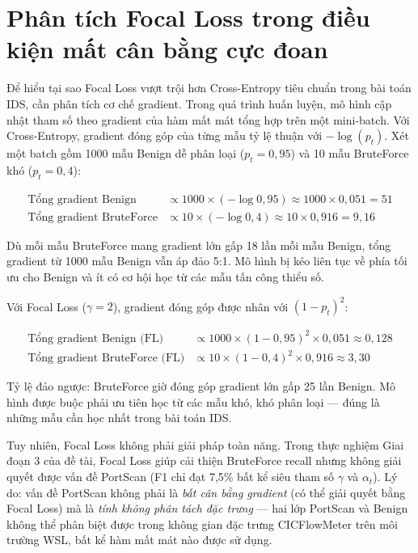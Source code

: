 \documentclass[../DoAn.tex]{subfiles}
\begin{document}
\section{Phân tích Focal Loss trong điều kiện mất cân bằng cực đoan}
\label{sec:pt-focal}

Để hiểu tại sao Focal Loss vượt trội hơn Cross-Entropy tiêu chuẩn trong bài toán IDS, cần phân tích cơ chế gradient. Trong quá trình huấn luyện, mô hình cập nhật tham số theo gradient của hàm mất mát tổng hợp trên một mini-batch. Với Cross-Entropy, gradient đóng góp của từng mẫu tỷ lệ thuận với $-\log(p_t)$. Xét một batch gồm 1000 mẫu Benign dễ phân loại ($p_t = 0{,}95$) và 10 mẫu BruteForce khó ($p_t = 0{,}4$):

\begin{align}
    \text{Tổng gradient Benign} &\propto 1000 \times (-\log 0{,}95) \approx 1000 \times 0{,}051 = 51 \label{eq:grad-benign} \\
    \text{Tổng gradient BruteForce} &\propto 10 \times (-\log 0{,}4) \approx 10 \times 0{,}916 = 9{,}16 \label{eq:grad-bf}
\end{align}

Dù mỗi mẫu BruteForce mang gradient lớn gấp 18 lần mỗi mẫu Benign, tổng gradient từ 1000 mẫu Benign vẫn áp đảo 5:1. Mô hình bị kéo liên tục về phía tối ưu cho Benign và ít có cơ hội học từ các mẫu tấn công thiểu số.

Với Focal Loss ($\gamma = 2$), gradient đóng góp được nhân với $(1-p_t)^2$:

\begin{align}
    \text{Tổng gradient Benign (FL)} &\propto 1000 \times (1-0{,}95)^2 \times 0{,}051 \approx 0{,}128 \label{eq:grad-benign-fl} \\
    \text{Tổng gradient BruteForce (FL)} &\propto 10 \times (1-0{,}4)^2 \times 0{,}916 \approx 3{,}30 \label{eq:grad-bf-fl}
\end{align}

Tỷ lệ đảo ngược: BruteForce giờ đóng góp gradient lớn gấp 25 lần Benign. Mô hình được buộc phải ưu tiên học từ các mẫu khó, khó phân loại --- đúng là những mẫu cần học nhất trong bài toán IDS.

Tuy nhiên, Focal Loss không phải giải pháp toàn năng. Trong thực nghiệm Giai đoạn 3 của đề tài, Focal Loss giúp cải thiện BruteForce recall nhưng không giải quyết được vấn đề PortScan (F1 chỉ đạt 7,5\% bất kể siêu tham số $\gamma$ và $\alpha_t$). Lý do: vấn đề PortScan không phải là \textit{bất cân bằng gradient} (có thể giải quyết bằng Focal Loss) mà là \textit{tính không phân tách đặc trưng} --- hai lớp PortScan và Benign không thể phân biệt được trong không gian đặc trưng CICFlowMeter trên môi trường WSL, bất kể hàm mất mát nào được sử dụng.
\end{document}
